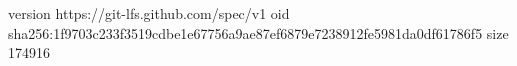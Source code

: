 version https://git-lfs.github.com/spec/v1
oid sha256:1f9703c233f3519cdbe1e67756a9ae87ef6879e7238912fe5981da0df61786f5
size 174916
